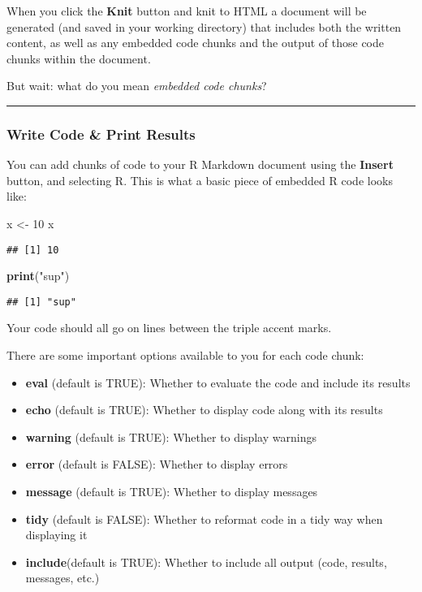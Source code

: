 \documentclass[]{article}
\newenvironment{Shaded}{\begin{snugshade}}{\end{snugshade}}
\newcommand{\DecValTok}[1]{\textcolor[rgb]{0.00,0.00,0.81}{#1}}
\newcommand{\KeywordTok}[1]{\textcolor[rgb]{0.13,0.29,0.53}{\textbf{#1}}}
\newcommand{\NormalTok}[1]{#1}
\newcommand{\StringTok}[1]{\textcolor[rgb]{0.31,0.60,0.02}{#1}}
\providecommand{\tightlist}{%
  \setlength{\itemsep}{0pt}\setlength{\parskip}{0pt}}
\begin{document}
When you click the \textbf{Knit} button and knit to HTML a document will
be generated (and saved in your working directory) that includes both
the written content, as well as any embedded code chunks and the output
of those code chunks within the document.

But wait: what do you mean \emph{embedded code chunks}?

\begin{center}\rule{0.5\linewidth}{\linethickness}\end{center}

\hypertarget{write-code-print-results}{%
\subsubsection{Write Code \& Print
Results}\label{write-code-print-results}}

You can add chunks of code to your R Markdown document using the
\textbf{Insert} button, and selecting R. This is what a basic piece of
embedded R code looks like:

\begin{Shaded}
\begin{Highlighting}[]
\NormalTok{x <-}\StringTok{ }\DecValTok{10}
\NormalTok{x}
\end{Highlighting}
\end{Shaded}

\begin{verbatim}
## [1] 10
\end{verbatim}

\begin{Shaded}
\begin{Highlighting}[]
\KeywordTok{print}\NormalTok{(}\StringTok{"sup"}\NormalTok{)}
\end{Highlighting}
\end{Shaded}

\begin{verbatim}
## [1] "sup"
\end{verbatim}

Your code should all go on lines between the triple accent marks.

There are some important options available to you for each code chunk:

\begin{itemize}
\tightlist
\item
  \textbf{eval} (default is TRUE): Whether to evaluate the code and
  include its results
\item
  \textbf{echo} (default is TRUE): Whether to display code along with
  its results
\item
  \textbf{warning} (default is TRUE): Whether to display warnings
\item
  \textbf{error} (default is FALSE): Whether to display errors
\item
  \textbf{message} (default is TRUE): Whether to display messages
\item
  \textbf{tidy} (default is FALSE): Whether to reformat code in a tidy
  way when displaying it
\item
  \textbf{include}(default is TRUE): Whether to include all output
  (code, results, messages, etc.)
\end{itemize}
\end{document}
